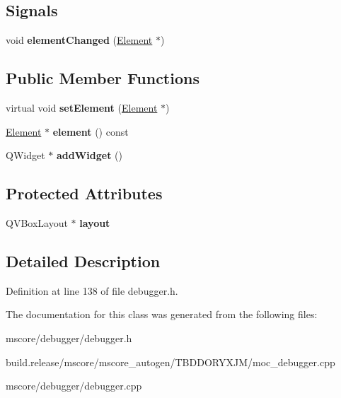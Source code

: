 \subsection*{Signals}
\begin{DoxyCompactItemize}
\item 
\mbox{\label{class_ms_1_1_show_element_base_a2a8bd73104f0aeda7d2656addcb11181}} 
void {\bfseries element\+Changed} (\hyperlink{class_ms_1_1_element}{Element} $\ast$)
\end{DoxyCompactItemize}
\subsection*{Public Member Functions}
\begin{DoxyCompactItemize}
\item 
\mbox{\label{class_ms_1_1_show_element_base_acfd8aa67a51557e9a9138a8627681b4b}} 
virtual void {\bfseries set\+Element} (\hyperlink{class_ms_1_1_element}{Element} $\ast$)
\item 
\mbox{\label{class_ms_1_1_show_element_base_a88a22064010808459d41e2da3c851ad3}} 
\hyperlink{class_ms_1_1_element}{Element} $\ast$ {\bfseries element} () const
\item 
\mbox{\label{class_ms_1_1_show_element_base_a08f658d064b77cb4fb826912f8b4ed97}} 
Q\+Widget $\ast$ {\bfseries add\+Widget} ()
\end{DoxyCompactItemize}
\subsection*{Protected Attributes}
\begin{DoxyCompactItemize}
\item 
\mbox{\label{class_ms_1_1_show_element_base_aa0ea7a9e0d680cdb5d9c23f6a26b8a8a}} 
Q\+V\+Box\+Layout $\ast$ {\bfseries layout}
\end{DoxyCompactItemize}


\subsection{Detailed Description}


Definition at line 138 of file debugger.\+h.



The documentation for this class was generated from the following files\+:\begin{DoxyCompactItemize}
\item 
mscore/debugger/debugger.\+h\item 
build.\+release/mscore/mscore\+\_\+autogen/\+T\+B\+D\+D\+O\+R\+Y\+X\+J\+M/moc\+\_\+debugger.\+cpp\item 
mscore/debugger/debugger.\+cpp\end{DoxyCompactItemize}
